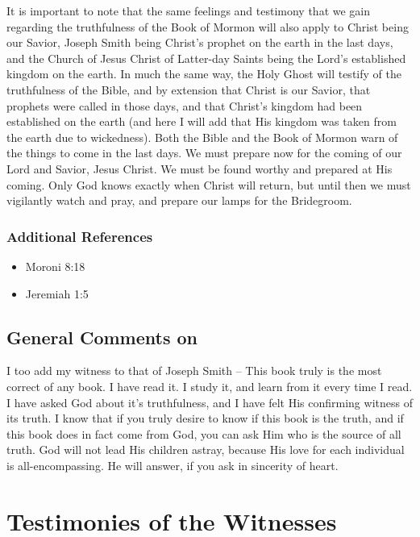 \documentclass[12pt]{report}
\begin{document}
It is important to note that the same feelings and testimony that we gain regarding the truthfulness of the Book of Mormon will also apply to Christ being our Savior, Joseph Smith being Christ's prophet on the earth in the last days, and the Church of Jesus Christ of Latter-day Saints being the Lord's established kingdom on the earth.  In much the same way, the Holy Ghost will testify of the truthfulness of the Bible, and by extension that Christ is our Savior, that prophets were called in those days, and that Christ's kingdom had been established on the earth (and here I will add that His kingdom was taken from the earth due to wickedness).  Both the Bible and the Book of Mormon warn of the things to come in the last days.  We must prepare now for the coming of our Lord and Savior, Jesus Christ.  We must be found worthy and prepared at His coming.  Only God knows exactly when Christ will return, but until then we must vigilantly watch and pray, and prepare our lamps for the Bridegroom.

\subsection{Additional References\label{intro:references9}}
\begin{itemize}
\item Moroni 8:18
\item Jeremiah 1:5
\end{itemize}

\section{General Comments on }
I too add my witness to that of Joseph Smith -- This book truly is the most correct of any book.  I have read it.  I study it, and learn from it every time I read.  I have asked God about it's truthfulness, and I have felt His confirming witness of its truth.  I know that if you truly desire to know if this book is the truth, and if this book does in fact come from God, you can ask Him who is the source of all truth.  God will not lead His children astray, because His love for each individual is all-encompassing.  He will answer, if you ask in sincerity of heart.

\chapter{Testimonies of the Witnesses\label{chapter:testimonies}}
\end{document}
